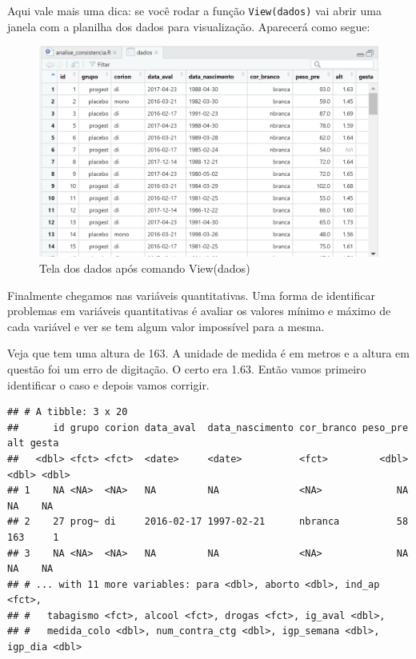 \documentclass[
]{book}
\newenvironment{Shaded}{\begin{snugshade}}{\end{snugshade}}
\newcommand{\DecValTok}[1]{\textcolor[rgb]{0.00,0.00,0.81}{#1}}
\newcommand{\NormalTok}[1]{#1}
\newcommand{\OperatorTok}[1]{\textcolor[rgb]{0.81,0.36,0.00}{\textbf{#1}}}
\begin{document}
Aqui vale mais uma dica: se você rodar a função \texttt{View(dados)} vai abrir uma janela com a planilha dos dados para visualização. Aparecerá como segue:

\begin{figure}
\includegraphics[width=1\linewidth]{figures/print-tela} \caption{Tela dos dados após comando View(dados)}\label{fig:view}
\end{figure}

Finalmente chegamos nas variáveis quantitativas. Uma forma de identificar problemas em variáveis quantitativas é avaliar os valores mínimo e máximo de cada variável e ver se tem algum valor impossível para a mesma.

Veja que tem uma altura de 163. A unidade de medida é em metros e a altura em questão foi um erro de digitação.
O certo era 1.63. Então vamos primeiro identificar o caso e depois vamos corrigir.

\begin{Shaded}
\end{Shaded}

\begin{verbatim}
## # A tibble: 3 x 20
##      id grupo corion data_aval  data_nascimento cor_branco peso_pre   alt gesta
##   <dbl> <fct> <fct>  <date>     <date>          <fct>         <dbl> <dbl> <dbl>
## 1    NA <NA>  <NA>   NA         NA              <NA>             NA    NA    NA
## 2    27 prog~ di     2016-02-17 1997-02-21      nbranca          58   163     1
## 3    NA <NA>  <NA>   NA         NA              <NA>             NA    NA    NA
## # ... with 11 more variables: para <dbl>, aborto <dbl>, ind_ap <fct>,
## #   tabagismo <fct>, alcool <fct>, drogas <fct>, ig_aval <dbl>,
## #   medida_colo <dbl>, num_contra_ctg <dbl>, igp_semana <dbl>, igp_dia <dbl>
\end{verbatim}
\end{document}
